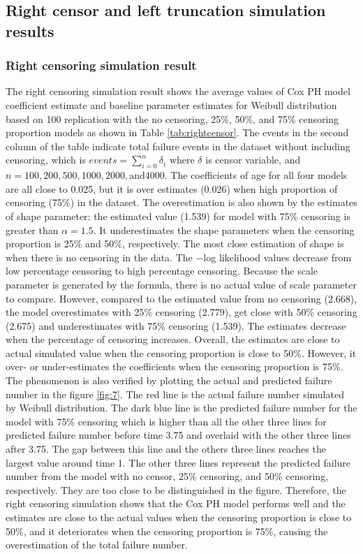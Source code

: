 \documentclass[12pt,letterpaper]{article}
\begin{document}
\subsection{Right censor and left truncation simulation results}
\subsubsection{Right censoring simulation result}
The right censoring simulation result shows the average values of Cox PH model coefficient estimate and baseline parameter estimates for Weibull distribution based on 100 replication with the no censoring, 25\%, 50\%, and 75\% censoring proportion models as shown in Table \ref{tab:rightcensor}. The events in the second column of the table indicate total failure events in the dataset without including censoring, which is $events=\sum_{i=0}^{n}{\delta_i}$ where $\delta$ is censor variable, and $n=100, 200, 500, 1000, 2000, \text{and} 4000$.  The coefficients of age for all four models are all close to 0.025, but it is over estimates (0.026) when high proportion of censoring (75\%) in the dataset. The overestimation is also shown by the estimates of shape parameter: the estimated value (1.539) for model with 75\% censoring is greater than $\alpha=1.5$. It underestimates the shape parameters when the censoring proportion is 25\% and 50\%, respectively. The most close estimation of shape is when there is no censoring in the data. The $-$log likelihood values decrease from low percentage censoring to high percentage censoring. Because the scale parameter is generated by the formula, there is no actual value of scale parameter to compare. However, compared to the estimated value from no censoring (2.668), the model overestimates with 25\% censoring (2.779), get close with 50\% censoring (2.675) and underestimates with 75\% censoring (1.539). The estimates decrease when the percentage of censoring increases. Overall, the estimates are close to actual simulated value when the censoring proportion is close to 50\%. However, it over- or under-estimates the coefficients when the censoring proportion is 75\%. The phenomenon is also verified by plotting the actual and predicted failure number in the figure \ref{fig:7}.  The red line is the actual failure number simulated by Weibull distribution. The dark blue line is the predicted failure number for the model with 75\% censoring which is higher than all the other three lines for predicted failure number before time 3.75 and overlaid with the other three lines after 3.75. The gap between this line and the others three lines reaches the largest value around time 1. The other three lines represent the predicted failure number from the model with no censor, 25\% censoring, and 50\% censoring, respectively. They are too close to be distinguished in the figure. Therefore, the right censoring simulation shows that the Cox PH model performs well and the estimates are close to the actual values when the censoring proportion is close to 50\%, and it deteriorates when the censoring proportion is 75\%, causing the overestimation of the total failure number.
\end{document}
